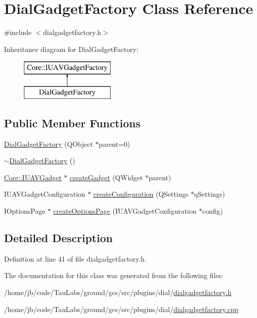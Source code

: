 \hypertarget{class_dial_gadget_factory}{\section{\-Dial\-Gadget\-Factory \-Class \-Reference}
\label{class_dial_gadget_factory}
}


{\ttfamily \#include $<$dialgadgetfactory.\-h$>$}

\-Inheritance diagram for \-Dial\-Gadget\-Factory\-:\begin{figure}[H]
\begin{center}
\leavevmode
\includegraphics[height=2.000000cm]{class_dial_gadget_factory}
\end{center}
\end{figure}
\subsection*{\-Public \-Member \-Functions}
\begin{DoxyCompactItemize}
\item 
\hyperlink{group___dial_plugin_ga96aa76f96e82147d1054198b8e5baccc}{\-Dial\-Gadget\-Factory} (\-Q\-Object $\ast$parent=0)
\item 
\hyperlink{group___dial_plugin_gaa1a6c5c829367397107f9bf058d3838f}{$\sim$\-Dial\-Gadget\-Factory} ()
\item 
\hyperlink{class_core_1_1_i_u_a_v_gadget}{\-Core\-::\-I\-U\-A\-V\-Gadget} $\ast$ \hyperlink{group___dial_plugin_gaa66ae505f320ed3092d13c52533951fb}{create\-Gadget} (\-Q\-Widget $\ast$parent)
\item 
\-I\-U\-A\-V\-Gadget\-Configuration $\ast$ \hyperlink{group___dial_plugin_ga19fedc047658860b63df440fcd9d58c0}{create\-Configuration} (\-Q\-Settings $\ast$q\-Settings)
\item 
\-I\-Options\-Page $\ast$ \hyperlink{group___dial_plugin_gabea23502f0a1a7c8b37131c0a24faeb8}{create\-Options\-Page} (\-I\-U\-A\-V\-Gadget\-Configuration $\ast$config)
\end{DoxyCompactItemize}


\subsection{\-Detailed \-Description}


\-Definition at line 41 of file dialgadgetfactory.\-h.



\-The documentation for this class was generated from the following files\-:\begin{DoxyCompactItemize}
\item 
/home/jb/code/\-Tau\-Labs/ground/gcs/src/plugins/dial/\hyperlink{dialgadgetfactory_8h}{dialgadgetfactory.\-h}\item 
/home/jb/code/\-Tau\-Labs/ground/gcs/src/plugins/dial/\hyperlink{dialgadgetfactory_8cpp}{dialgadgetfactory.\-cpp}\end{DoxyCompactItemize}
